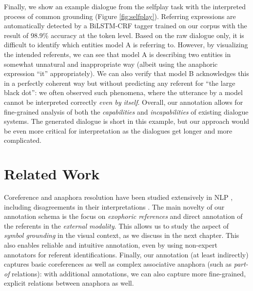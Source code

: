 Finally, we show an example dialogue from the selfplay task with the interpreted process of common grounding (Figure \ref{fig:selfplay}). Referring expressions are automatically detected by a BiLSTM-CRF tagger \citep{huang2015bidirectional} trained on our corpus with the result of 98.9\% accuracy at the token level. Based on the raw dialogue only, it is difficult to identify which entities model A is referring to. However, by visualizing the intended referents, we can see that model A is describing two entities in somewhat unnatural and inappropriate way (albeit using the anaphoric expression ``it'' appropriately). We can also verify that model B acknowledges this in a perfectly coherent way but without predicting any referent for ``the large black dot'': we often observed such phenomena, where the utterance by a model cannot be interpreted correctly \textit{even by itself}. Overall, our annotation allows for fine-grained analysis of both the \textit{capabilities} and \textit{incapabilities} of existing dialogue systems. The generated dialogue is short in this example, but our approach would be even more critical for interpretation as the dialogues get longer and more complicated.

\section{Related Work}
\label{03_sec:related_work}

Coreference and anaphora resolution have been studied extensively in NLP \citep{pradhan2011conll,poesio2016anaphora}, including disagreements in their interpretations \citep{recasens-etal-2012-annotating,poesio-etal-2019-crowdsourced}. The main novelty of our annotation schema is the focus on \textit{exophoric references} and direct annotation of the referents in the \textit{external modality}. This allows us to study the aspect of \textit{symbol grounding} in the visual context, as we discuss in the next chapter. This also enables reliable and intuitive annotation, even by using non-expert annotators for referent identifications. Finally, our annotation (at least indirectly) captures basic coreferences as well as complex associative anaphora (such as \textit{part-of} relations): with additional annotations, we can also capture more fine-grained, explicit relations between anaphora as well.

